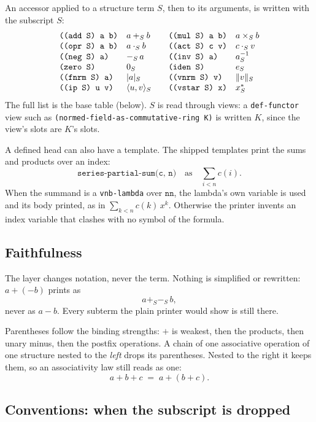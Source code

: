 An accessor applied to a structure term $S$, then to its arguments,
is written with the subscript $S$:
\[
\begin{array}{ll@{\qquad}ll}
\texttt{((add S) a b)}  & a +_S b        & \texttt{((mul S) a b)}  & a \times_S b \\
\texttt{((opr S) a b)}  & a \cdot_S b    & \texttt{((act S) c v)}  & c \cdot_S v \\
\texttt{((neg S) a)}    & -_S\, a        & \texttt{((inv S) a)}    & a^{-1}_S \\
\texttt{(zero S)}       & 0_S            & \texttt{(iden S)}       & e_S \\
\texttt{((fnrm S) a)}   & \lvert a \rvert_S & \texttt{((vnrm S) v)} & \lVert v \rVert_S \\
\texttt{((ip S) u v)}   & \langle u, v \rangle_S & \texttt{((vstar S) x)} & x^{*}_S
\end{array}
\]
The full list is the base table (below).  $S$ is read through views:
a \texttt{def-functor} view such as
\texttt{(normed-field-as-commutative-ring K)} is written $K$, since the
view's slots are $K$'s slots.

A defined head can also have a template.  The shipped templates print
the sums and products over an index:
\[
  \texttt{series-partial-sum(c, n)} \quad\text{as}\quad \sum_{i < n} c(i).
\]
When the summand is a \texttt{vnb-lambda} over $\mathtt{nn}$, the
lambda's own variable is used and its body printed, as in
$\sum_{k < n} c(k)\, x^k$.  Otherwise the printer invents an index
variable that clashes with no symbol of the formula.

\subsection{Faithfulness}

The layer changes notation, never the term.  Nothing is simplified or
rewritten: $a + (-b)$ prints as
\[
  a +_S -_S\, b ,
\]
never as $a - b$.  Every subterm the plain printer would show is still
there.

Parentheses follow the binding strengths: $+$ is weakest, then the
products, then unary minus, then the postfix operations.  A chain of
one associative operation of one structure nested to the \emph{left}
drops its parentheses.  Nested to the right it keeps them, so an
associativity law still reads as one:
\[
  a + b + c \;=\; a + (b + c).
\]

\subsection{Conventions: when the subscript is dropped}

